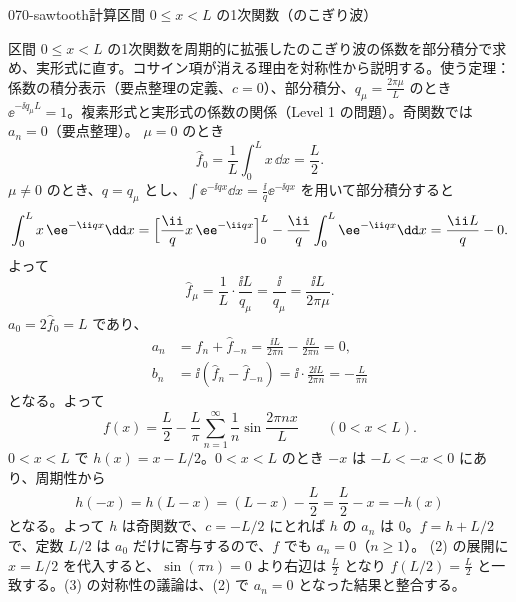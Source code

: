 \documentclass[uplatex,dvipdfmx,a4paper,11pt]{jsarticle}
\begin{document}
\begin{mondai}{070-sawtooth}{計算}{区間 $0\le x<L$ の1次関数（のこぎり波）}
\begin{tadashii}
\houshin 区間 $0\le x<L$ の1次関数を周期的に拡張したのこぎり波の係数を部分積分で求め、実形式に直す。コサイン項が消える理由を対称性から説明する。使う定理：係数の積分表示（要点整理の定義、$c=0$）、部分積分、$q_{\mu}=\frac{2\pi\mu}{L}$ のとき $\ee^{-\ii q_{\mu}L}=1$。複素形式と実形式の係数の関係（Level 1 の問題）。奇関数では $a_n=0$（要点整理）。
\keisan
{} $\mu=0$ のとき
\[
\hat{f}_0=\frac{1}{L}\int_{0}^{L}x\,\dd x=\frac{L}{2}.
\]
$\mu\neq0$ のとき、$q=q_{\mu}$ とし、$\int\ee^{-\ii qx}\dd x=\frac{\ii}{q}\ee^{-\ii qx}$ を用いて部分積分すると
\[
\int_{0}^{L}x\,\ee^{-\ii qx}\dd x=\Bigl[\frac{\ii}{q}x\,\ee^{-\ii qx}\Bigr]_{0}^{L}-\frac{\ii}{q}\int_{0}^{L}\ee^{-\ii qx}\dd x=\frac{\ii L}{q}-0 .
\]
よって
\[
\hat{f}_{\mu}=\frac{1}{L}\cdot\frac{\ii L}{q_{\mu}}=\frac{\ii}{q_{\mu}}=\frac{\ii L}{2\pi\mu}.
\]
 $a_0=2\hat{f}_0=L$ であり、
\begin{align*}
a_n&=\hat{f}_n+\hat{f}_{-n}=\frac{\ii L}{2\pi n}-\frac{\ii L}{2\pi n}=0,\\
b_n&=\ii(\hat{f}_n-\hat{f}_{-n})=\ii\cdot\frac{2\ii L}{2\pi n}=-\frac{L}{\pi n}
\end{align*}
となる。よって
\[
f(x)=\frac{L}{2}-\frac{L}{\pi}\sum_{n=1}^{\infty}\frac{1}{n}\sin\frac{2\pi nx}{L}\qquad(0<x<L).
\]
 $0<x<L$ で $h(x)=x-L/2$。$0<x<L$ のとき $-x$ は $-L<-x<0$ にあり、周期性から
\[
h(-x)=h(L-x)=(L-x)-\frac{L}{2}=\frac{L}{2}-x=-h(x)
\]
となる。よって $h$ は奇関数で、$c=-L/2$ にとれば $h$ の $a_n$ は $0$。$f=h+L/2$ で、定数 $L/2$ は $a_0$ だけに寄与するので、$f$ でも $a_n=0$（$n\ge1$）。
\kenzan (2) の展開に $x=L/2$ を代入すると、$\sin(\pi n)=0$ より右辺は $\frac{L}{2}$ となり $f(L/2)=\frac{L}{2}$ と一致する。(3) の対称性の議論は、(2) で $a_n=0$ となった結果と整合する。
\end{tadashii}
\end{mondai}
\end{document}
